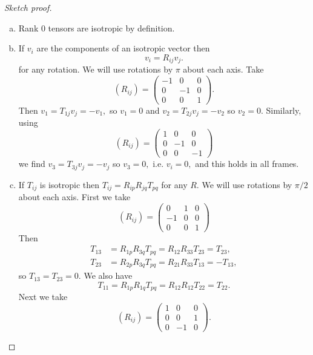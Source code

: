 \begin{proof}[Sketch proof]
    \begin{enumerate}[(a)]
        \item Rank 0 tensors are isotropic by definition.
        \item If $v_{i}$ are the components of an isotropic vector then
        \[
        v_{i}=R_{i j} v_{j}.
        \]
        for any rotation. We will use rotations by $\pi$ about each axis. Take
        \[
        \left(R_{i j}\right)=\begin{pmatrix}
            -1 & 0 & 0 \\
        0 & -1 & 0 \\
        0 & 0 & 1
        \end{pmatrix}.
        \]
        Then $v_{1}=T_{1 j} v_{j}=-v_{1},$ so $v_{1}=0$ and $v_{2}=T_{2 j} v_{j}=-v_{2}$ so $v_{2}=0 .$ Similarly, using
        \[
        \left(R_{i j}\right)=\begin{pmatrix}
            1 & 0 & 0 \\
        0 & -1 & 0 \\
        0 & 0 & -1
        \end{pmatrix}
        \]
        we find $v_{3}=T_{3 j} v_{j}=-v_{j}$ so $v_{3}=0,$ i.e. $v_{i}=0,$ and this holds in all frames.
        \item If $T_{i j}$ is isotropic then $T_{i j}=R_{i p} R_{j q} T_{p q}$ for any $R $. We will use rotations by $\pi / 2$ about each axis. First we take
        \[
        \left(R_{i j}\right)=\begin{pmatrix}
            0 & 1 & 0 \\
        -1 & 0 & 0 \\
        0 & 0 & 1
        \end{pmatrix}
        \]
        Then
        \begin{align*}
            T_{13}&=R_{1 p} R_{3 q} T_{p q}=R_{12} R_{33} T_{23}=T_{23}, \\
        T_{23}&=R_{2 p} R_{3 q} T_{p q}=R_{21} R_{33} T_{13}=-T_{13},
        \end{align*}
        so $T_{13}=T_{23}=0 .$ We also have
        \[
        T_{11}=R_{1 p} R_{1 q} T_{p q}=R_{12} R_{12} T_{22}=T_{22}.
        \]
        Next we take
        \[
        \left(R_{i j}\right)=\begin{pmatrix}
            1 & 0 & 0 \\
        0 & 0 & 1 \\
        0 & -1 & 0
        \end{pmatrix}.
\]
\end{enumerate}
\end{proof}
